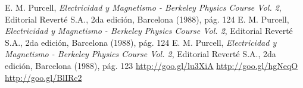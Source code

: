 \documentclass[twoside,twocolumn,a4paper]{article}
\begin{document}

\begin{thebibliography}{99} %

 E. M. Purcell, \textit{Electricidad y Magnetismo - Berkeley Physics Course Vol. 2}, Editorial Revert\'e S.A., 2da edici\'on, Barcelona (1988), p\'ag. 124
 E. M. Purcell, \textit{Electricidad y Magnetismo - Berkeley Physics Course Vol. 2}, Editorial Revert\'e S.A., 2da edici\'on, Barcelona (1988), p\'ag. 124
 E. M. Purcell, \textit{Electricidad y Magnetismo - Berkeley Physics Course Vol. 2}, Editorial Revert\'e S.A., 2da edici\'on, Barcelona (1988), p\'ag. 123
 \url{http://goo.gl/lu3XiA}
 \url{http://goo.gl/hgNeqO}
 \url{http://goo.gl/BlIRc2}
 
\end{thebibliography}

\end{document}
